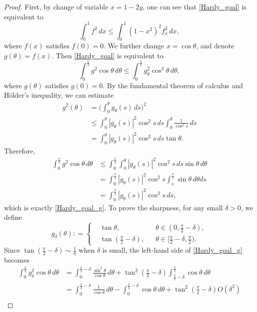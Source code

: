 \documentclass[reqno, 11pt]{amsart}
\theoremstyle{plain}
\theoremstyle{definition}
\theoremstyle{remark}
\numberwithin{equation}{section}
\begin{document}
\begin{proof}
First, by change of variable $x = 1-2y$, one can see that \eqref{Hardy_goal} is equivalent to
$$
\int_0^1 f^2 \,dx \le \int_0^1 (1-x^2)^2 f_x^2 \, dx,
$$
where $f(x)$ satisfies $f(0) = 0$. We further change $x = \cos \theta$, and denote $g(\theta) = f(x)$. Then \eqref{Hardy_goal} is equivalent to
\begin{equation}\label{Hardy_goal_g}
\int_0^{\frac{\pi}{2}} g^2 \cos \theta \,d\theta \le \int_0^{\frac{\pi}{2}} g_\theta^2 \cos^3 \theta \, d\theta,
\end{equation}
where $g(\theta)$ satisfies $g(0) = 0$. By the fundamental theorem of calculus and H\"older's inequality, we can estimate
\begin{align*}
g^2(\theta) &= \Big(\int_0^\theta g_\theta (s) \, ds \Big)^2\\
&\le \int_0^\theta |g_\theta (s)|^2 \cos^2 s \, ds \int_0^\theta \frac{1}{\cos^2 s} \, ds\\
&= \int_0^\theta |g_\theta (s)|^2 \cos^2 s \, ds \tan \theta.
\end{align*}
Therefore,
\begin{align*}
\int_0^{\frac{\pi}{2}} g^2 \cos \theta \,d\theta & \le \int_0^{\frac{\pi}{2}} \int_0^\theta |g_\theta (s)|^2 \cos^2 s \, ds \sin \theta \, d\theta\\
& = \int_0^{\frac{\pi}{2}}    |g_\theta (s)|^2 \cos^2 s \int_s^{\frac{\pi}{2}} \sin \theta \, d\theta ds\\
& = \int_0^{\frac{\pi}{2}}    |g_\theta (s)|^2 \cos^3 s\, ds,
\end{align*}
which is exactly \eqref{Hardy_goal_g}. To prove the sharpness, for any small $\delta > 0$, we define
$$
g_\delta(\theta): = \left\{
\begin{aligned}
&\tan \theta, && \theta \in (0, \frac{\pi}{2} - \delta),\\
&\tan (\frac{\pi}{2} - \delta),  && \theta \in [\frac{\pi}{2} - \delta, \frac{\pi}{2}).
\end{aligned}
\right.
$$
Since $\tan (\frac{\pi}{2} - \delta) \sim \frac{1}{\delta}$ when $\delta$ is small, the left-hand side of \eqref{Hardy_goal_g} becomes
\begin{align*}
\int_0^{\frac{\pi}{2}} g_\delta^2 \cos \theta \,d\theta &= \int_0^{\frac{\pi}{2} - \delta} \frac{\sin^2 \theta}{\cos \theta} \, d\theta + \tan^2 (\frac{\pi}{2} - \delta) \int_{\frac{\pi}{2} - \delta}^{\frac{\pi}{2}} \cos \theta \, d\theta\\
&= \int_0^{\frac{\pi}{2} - \delta} \frac{1}{\cos \theta} \, d\theta -  \int_0^{\frac{\pi}{2} - \delta} \cos \theta \, d\theta + \tan^2 (\frac{\pi}{2} - \delta) O(\delta^2)\\

\end{align*}
\end{proof}
\end{document}
